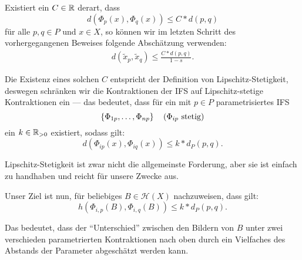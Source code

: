 \documentclass[afourpaper]{tufte-handout}
\begin{document}
Existiert ein \( C \in \mathbb{R} \) derart, dass
\begin{equation*}
  d(\Phi_p(x), \Phi_q(x)) \leq C * d(p,q)
\end{equation*}
für alle \( p,q \in P \) und \( x \in X \), so können wir im letzten Schritt des vorhergegangenen Beweises folgende Abschätzung verwenden:
\begin{align*}
  d(\widetilde{x}_p, \widetilde{x}_q) \leq \frac{C * d(p,q)}{1-s}\text{.}
\end{align*}

Die Existenz eines solchen \( C \) entspricht der Definition von Lipschitz-Stetigkeit, deswegen schränken wir die Kontraktionen der IFS auf Lipschitz-stetige Kontraktionen ein --- das bedeutet, dass für ein mit \( p \in P \) parametrisiertes IFS
\begin{equation*}
  \left \{ \Phi_{1p},\dots,\Phi_{np} \right \} \quad \text{(\( \Phi_{ip} \) stetig)}
\end{equation*}
ein \( k \in \mathbb{R}_{> 0} \) existiert, sodass gilt:
\begin{equation*}
  d(\Phi_{ip}(x), \Phi_{iq}(x)) \leq k * d_P(p,q)\text{.}
\end{equation*}

Lipschitz-Stetigkeit ist zwar nicht die allgemeinste Forderung, aber sie ist einfach zu handhaben und reicht für unsere Zwecke aus.

Unser Ziel ist nun, für beliebiges \( B \in \mathcal{H}(X) \) nachzuweisen, dass gilt:
\begin{equation*}
  h(\Phi_{i,p}(B), \Phi_{i,q}(B)) \leq k * d_P(p,q)\text{.}
\end{equation*}

Das bedeutet, dass der ``Unterschied'' zwischen den Bildern von \( B \) unter zwei verschieden parametrierten Kontraktionen nach oben durch ein Vielfaches des Abstands der Parameter abgeschätzt werden kann.
\end{document}
